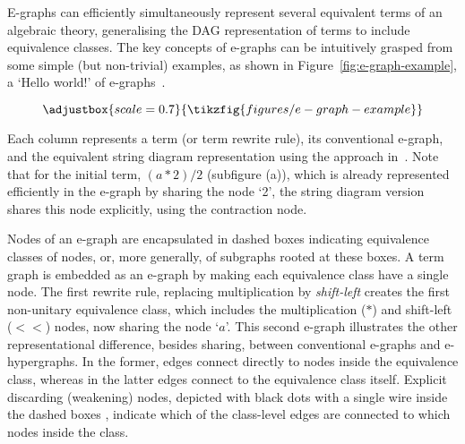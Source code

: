 \documentclass[]{IEEEtran}
\begin{document}
E-graphs can efficiently simultaneously represent several equivalent terms of an algebraic theory, generalising the DAG representation of terms to include equivalence classes.
The key concepts of e-graphs can be intuitively grasped from some simple (but non-trivial) examples, as shown in Figure~\ref{fig:e-graph-example}, a `Hello world!' of e-graphs~\cite{EggPaper}.

\begin{figure*}
\[
\adjustbox{scale=0.7}{
\tikzfig{figures/e-graph-example}
}
\]
\caption{E-graph example (top) and its equivalent string diagram representation (bottom)}
\label{fig:e-graph-example}
\end{figure*}

Each column represents a term (or term rewrite rule), its conventional e-graph, and the equivalent string diagram representation using the approach in~\cite{ghica2024equivalencehypergraphsegraphsmonoidal}. 
Note that for the initial term, $(a*2)/2$ (subfigure (a)), which is already represented efficiently in the e-graph by sharing the node `2', the string diagram version shares this node explicitly, using the contraction node.

Nodes of an e-graph are encapsulated in dashed boxes indicating equivalence classes of nodes, or, more generally, of subgraphs rooted at these boxes.
A term graph is embedded as an e-graph by making each equivalence class have a single node.
The first rewrite rule, replacing multiplication by \emph{shift-left} creates the first non-unitary equivalence class, which includes the multiplication ($*$) and shift-left ($<\!\!<$) nodes,  now sharing the node `$a$'.
This second e-graph illustrates the other representational difference, besides sharing, between conventional e-graphs and e-hypergraphs.
In the former, edges connect directly to nodes inside the equivalence class, whereas in the latter edges connect to the equivalence class itself.
Explicit discarding (weakening) nodes, depicted with black dots with a single wire inside the dashed boxes 
, indicate which of the class-level edges are connected to which nodes inside the class.
\end{document}
